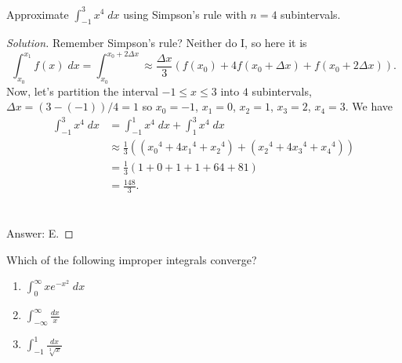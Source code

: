 \begin{problem}
Approximate $\int_{-1}^3 x^4\;dx$ using Simpson's rule with $n=4$
subintervals.
\end{problem}
\begin{proof}[Solution]
Remember Simpson's rule? Neither do I, so here it is
\begin{equation}
\label{eq:simpsons-rule}
\int_{x_0}^{x_1}f(x)\;dx=
\int_{x_0}^{x_0+2\Delta x}\approx
\frac{\Delta x}{3}\left(
f\left(x_0\right)
+4f\left(x_0+\Delta x\right)
+f\left(x_0+2\Delta x\right)
\right).
\end{equation}
Now, let's partition the interval $-1\leq x\leq 3$ into $4$ subintervals,
$\Delta x=(3-(-1))/4=1$ so $x_0=-1$, $x_1=0$, $x_2=1$, $x_3=2$, $x_4=3$. We
have
\begin{align*}
\int_{-1}^3 x^4\;dx
&=\int_{-1}^1x^4\;dx
  +\int_{1}^3x^4\;dx\\
&\approx \frac{1}{3}
\left(\left({x_0}^4+4{x_1}^4+{x_2}^4\right)
+\left({x_2}^4+4{x_3}^4+{x_4}^4\right)\right)\\
&=\frac{1}{3}\left(1+0+1+1+64+81\right)\\
&=\boxed{\frac{148}{3}.}
\end{align*}
\\\\
Answer: E.
\end{proof}
\begin{problem}
Which of the following improper integrals converge?
\begin{enumerate}[label=\MakeUppercase{\roman*}.]
\item $\displaystyle\int_0^\infty xe^{-x^2}\;dx$
\item $\displaystyle\int_{-\infty}^\infty\frac{dx}{x}$
\item $\displaystyle\int_{-1}^1\frac{dx}{\sqrt[3]{x}}$
\end{enumerate}
\end{problem}
